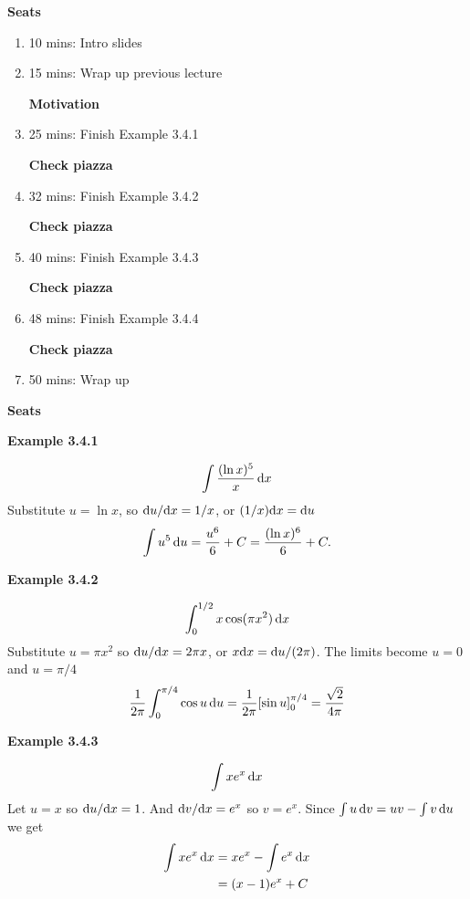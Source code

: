 \textbf{Seats}
\begin{enumerate}
    \item 10 mins: Intro slides \par
    \item 15 mins: Wrap up previous lecture \par
    \textbf{Motivation}
    \item 25 mins: Finish Example 3.4.1 \par
    \textbf{Check piazza}
    \item 32 mins: Finish Example 3.4.2 \par
    \textbf{Check piazza}
    \item 40 mins: Finish Example 3.4.3 \par
    \textbf{Check piazza}
    \item 48 mins: Finish Example 3.4.4 \par
    \textbf{Check piazza}
    \item 50 mins: Wrap up \par
\end{enumerate}
\textbf{Seats}

\vspace{10mm}
\textbf{Example 3.4.1}

\begin{align*}
    \int \frac{(\ln x)^5}{x} \, {\rm d}x
\end{align*}
Substitute $u = \ln x$, so ${\rm d} u/{\rm d}x = 1/x$, or $(1/x){\rm d}x = {\rm d} u$
\begin{align*}
    \int u^5 \, {\rm d}u = \frac{u^6}{6} +C = \frac{(\ln x)^6}{6} +C.
\end{align*}

\vspace{10mm}
\textbf{Example 3.4.2}

\begin{align*}
    \int_0^{1/2} x \cos(\pi x^2) \, {\rm d}x
\end{align*}
Substitute $u = \pi x^2$ so ${\rm d} u/{\rm d}x = 2 \pi x $, or $x{\rm d}x = {\rm d} u / (2\pi)$. The limits become $u=0$ and $u = \pi/4$
\begin{align*}
\frac{1}{2 \pi} \int_0^{\pi/4} \cos u \, {\rm d}u = \frac{1}{2 \pi} [\sin u]_0^{\pi/4} = \frac{\sqrt{2}}{4\pi}
\end{align*}

\vspace{10mm}
\textbf{Example 3.4.3}

\begin{align*}
    \int x e^x \, {\rm d}x
\end{align*}
Let $u = x$ so ${\rm d} u/{\rm d}x = 1$.
And ${\rm d} v/{\rm d}x = e^x$ so $v = e^x$.
Since $\int u\, {\rm d}v = uv - \int v \, {\rm d} u$ we get
\begin{align*}
    \int x e^x \, {\rm d}x &= x e^x - \int e^x \, {\rm d} x\\
    &= (x-1)e^x + C
\end{align*}

